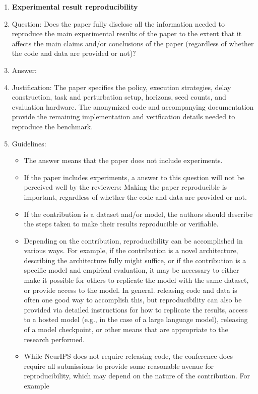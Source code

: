 \documentclass{article}
\begin{document}
\begin{enumerate}
    \item {\bf Experimental result reproducibility}
    \item[] Question: Does the paper fully disclose all the information needed to reproduce the main experimental results of the paper to the extent that it affects the main claims and/or conclusions of the paper (regardless of whether the code and data are provided or not)?
    \item[] Answer: \answerYes{}{}
    \item[] Justification: The paper specifies the policy, execution strategies, delay construction, task and perturbation setup, horizons, seed counts, and evaluation hardware. The anonymized code and accompanying documentation provide the remaining implementation and verification details needed to reproduce the benchmark.
    \item[] Guidelines:
    \begin{itemize}
        \item The answer \answerNA{} means that the paper does not include experiments.
        \item If the paper includes experiments, a \answerNo{} answer to this question will not be perceived well by the reviewers: Making the paper reproducible is important, regardless of whether the code and data are provided or not.
        \item If the contribution is a dataset and\slash or model, the authors should describe the steps taken to make their results reproducible or verifiable.
        \item Depending on the contribution, reproducibility can be accomplished in various ways. For example, if the contribution is a novel architecture, describing the architecture fully might suffice, or if the contribution is a specific model and empirical evaluation, it may be necessary to either make it possible for others to replicate the model with the same dataset, or provide access to the model. In general. releasing code and data is often one good way to accomplish this, but reproducibility can also be provided via detailed instructions for how to replicate the results, access to a hosted model (e.g., in the case of a large language model), releasing of a model checkpoint, or other means that are appropriate to the research performed.
        \item While NeurIPS does not require releasing code, the conference does require all submissions to provide some reasonable avenue for reproducibility, which may depend on the nature of the contribution. For example

\end{itemize}
\end{enumerate}
\end{document}

